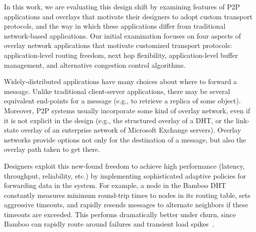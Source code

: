 \documentclass{sig-alt-full}
\renewcommand{\subsection}[1]{\vspace{12pt}\noindent{\bf #1:}}
\newcommand{\note}[1]{}
\begin{document}
\note{Paper outline 2: What's different in the apps?  What's required of the transport?} 
 
In this work, we are evaluating this design shift by examining features of P2P 
applications and overlays that motivate their designers to adopt custom transport 
protocols, and the way in which these applications differ from traditional 
network-based applications. Our initial examination focuses on
four aspects of overlay network applications that motivate customized
transport protocols: application-level routing freedom,
next hop flexibility, application-level buffer management, and alternative 
congestion control algorithms.


\subsection{Application-level routing freedom}
\label{sec:routingFreedom}
Widely-distributed applications have many choices about
where to forward a message.  Unlike traditional client-server
applications, there may be several equivalent end-points for a message 
(e.g., to retrieve a replica of some object).  
Moreover, P2P systems usually incorporate some kind of overlay
network, even if it is not explicit in the
design (e.g., the structured overlay of a DHT, or the
link-state overlay of an enterprise network of Microsoft
Exchange servers).  Overlay networks provide options not only for the
destination of a message, but also the overlay path taken to get
there.

Designers exploit this new-found freedom to achieve high performance
(latency, throughput, reliability, etc.) by implementing
sophisticated adaptive policies for forwarding data in the system.  For
example, a node in the Bamboo DHT~\cite{rhea_usenix_2004} constantly
measures minimum round-trip times to nodes in its routing table, sets
aggressive timeouts, and rapidly resends messages to alternate
neighbors if these timeouts are exceeded.   This performs
dramatically better under churn, since Bamboo can rapidly route 
around failures and transient load spikes~\cite{rhea_usenix_2004}. 
\end{document}
